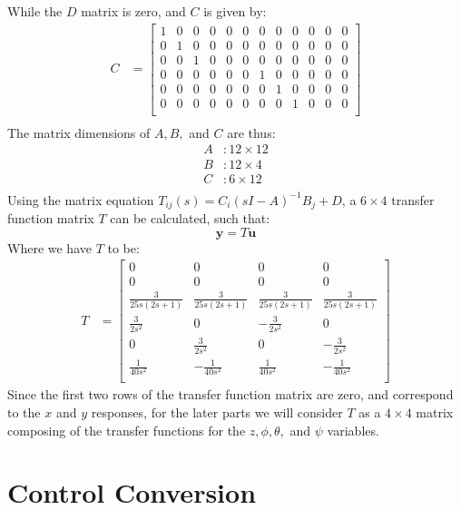 \documentclass[12pt]{article}
\begin{document}
While the $D$ matrix is zero, and $C$ is given by:
\begin{align*}
  C &= 
  \begin{bmatrix}
  1 & 0 & 0 & 0 & 0 & 0 & 0 & 0 & 0 & 0 & 0 & 0 \\
  0 & 1 & 0 & 0 & 0 & 0 & 0 & 0 & 0 & 0 & 0 & 0 \\
  0 & 0 & 1 & 0 & 0 & 0 & 0 & 0 & 0 & 0 & 0 & 0 \\
  0 & 0 & 0 & 0 & 0 & 0 & 1 & 0 & 0 & 0 & 0 & 0 \\
  0 & 0 & 0 & 0 & 0 & 0 & 0 & 1 & 0 & 0 & 0 & 0 \\
  0 & 0 & 0 & 0 & 0 & 0 & 0 & 0 & 1 & 0 & 0 & 0 \\
  \end{bmatrix} \\
\end{align*}
The matrix dimensions of $A, B,$ and $C$ are thus:
\begin{align*}
  A &: 12\times12\\
  B &: 12\times4\\
  C &: 6\times12\\
\end{align*}
Using the matrix equation $T_{ij}(s) = C_i(sI - A)^{-1}B_j + D$, 
a $6\times4$ transfer function matrix $T$ can be calculated, such that:
  $$\textbf{y} = T\textbf{u}$$
Where we have $T$ to be:
\begin{align*}
  T &= 
  \begin{bmatrix}
    0 & 0 & 0 & 0 \\
    0 & 0 & 0 & 0 \\[6pt]
    \frac{3}{25s(2s + 1)} & \frac{3}{25s(2s + 1)} & \frac{3}{25s(2s + 1)} & \frac{3}{25s(2s + 1)} \\[6pt]
    \frac{3}{2s^2} & 0 & -\frac{3}{2s^2} & 0 \\[6pt]
    0 & \frac{3}{2s^2} & 0 & -\frac{3}{2s^2} \\[6pt]
    \frac{1}{40s^2} & -\frac{1}{40s^2} & \frac{1}{40s^2} & -\frac{1}{40s^2} \\[6pt]
  \end{bmatrix}
\end{align*}
Since the first two rows of the transfer function matrix are zero, and correspond to the $x$ and $y$ responses,
for the later parts we will consider $T$ as a $4\times4$ matrix composing of the transfer functions
for the $z,\phi, \theta,$ and $\psi$ variables.
\section*{Control Conversion}
\end{document}
